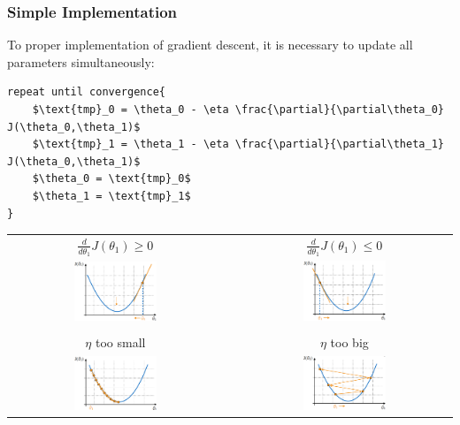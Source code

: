 \subsubsection{Simple Implementation}
To proper implementation of gradient descent, it is necessary to update all parameters simultaneously:
\begin{lstlisting}[mathescape=true]
repeat until convergence{
    $\text{tmp}_0 = \theta_0 - \eta \frac{\partial}{\partial\theta_0} J(\theta_0,\theta_1)$
    $\text{tmp}_1 = \theta_1 - \eta \frac{\partial}{\partial\theta_1} J(\theta_0,\theta_1)$
    $\theta_0 = \text{tmp}_0$
    $\theta_1 = \text{tmp}_1$
}
\end{lstlisting}
\begin{center}
   \begin{tabular}{c c c}
    $\frac{d}{d\theta_1} J(\theta_1) \geq 0$ & &
    $\frac{d}{d\theta_1} J(\theta_1) \leq 0$ \\
    \includegraphics[width=0.4\textwidth]{images/GradientDescent1.png} & &
    \includegraphics[width=0.4\textwidth]{images/GradientDescent2.png} \\
    \\
    $\eta$ too small & &
    $\eta$ too big \\
    \includegraphics[width=0.4\textwidth]{images/GradientDescent3.png} & &
    \includegraphics[width=0.4\textwidth]{images/GradientDescent4.png}
    \end{tabular} 
\end{center}
\newpage